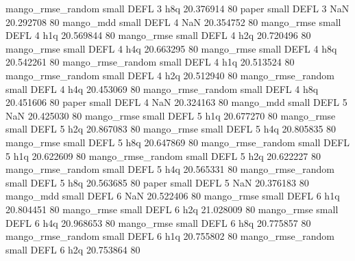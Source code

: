 mango_rmse_random      small     DEFL                 3                  h8q 20.376914 80
            paper      small     DEFL                 3                  NaN 20.292708 80
        mango_mdd      small     DEFL                 4                  NaN 20.354752 80
       mango_rmse      small     DEFL                 4                  h1q 20.569844 80
       mango_rmse      small     DEFL                 4                  h2q 20.720496 80
       mango_rmse      small     DEFL                 4                  h4q 20.663295 80
       mango_rmse      small     DEFL                 4                  h8q 20.542261 80
mango_rmse_random      small     DEFL                 4                  h1q 20.513524 80
mango_rmse_random      small     DEFL                 4                  h2q 20.512940 80
mango_rmse_random      small     DEFL                 4                  h4q 20.453069 80
mango_rmse_random      small     DEFL                 4                  h8q 20.451606 80
            paper      small     DEFL                 4                  NaN 20.324163 80
        mango_mdd      small     DEFL                 5                  NaN 20.425030 80
       mango_rmse      small     DEFL                 5                  h1q 20.677270 80
       mango_rmse      small     DEFL                 5                  h2q 20.867083 80
       mango_rmse      small     DEFL                 5                  h4q 20.805835 80
       mango_rmse      small     DEFL                 5                  h8q 20.647869 80
mango_rmse_random      small     DEFL                 5                  h1q 20.622609 80
mango_rmse_random      small     DEFL                 5                  h2q 20.622227 80
mango_rmse_random      small     DEFL                 5                  h4q 20.565331 80
mango_rmse_random      small     DEFL                 5                  h8q 20.563685 80
            paper      small     DEFL                 5                  NaN 20.376183 80
        mango_mdd      small     DEFL                 6                  NaN 20.522406 80
       mango_rmse      small     DEFL                 6                  h1q 20.804451 80
       mango_rmse      small     DEFL                 6                  h2q 21.028009 80
       mango_rmse      small     DEFL                 6                  h4q 20.968653 80
       mango_rmse      small     DEFL                 6                  h8q 20.775857 80
mango_rmse_random      small     DEFL                 6                  h1q 20.755802 80
mango_rmse_random      small     DEFL                 6                  h2q 20.753864 80
